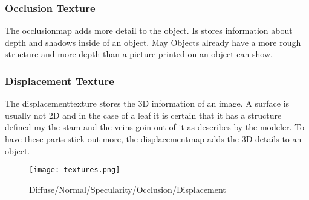 \subsubsection*{Occlusion Texture}
The occlusionmap adds more detail to the object. Is stores information about depth and shadows inside of an object. May Objects already have a more rough structure and more depth than a picture printed on an object can show.
\subsubsection*{Displacement Texture}
The displacementtexture stores the 3D information of an image. A surface is usually not 2D and in the case of a leaf it is certain that it has a structure defined my the stam and the veins goin out of it as describes by the modeler. To have these parts stick out more, the displacementmap adds the 3D details to an object.
\begin{figure}[h]
	\centering
	\texttt{[image: textures.png]}
	\caption{Diffuse/Normal/Specularity/Occlusion/Displacement}
	\label{textures}
\end{figure}

